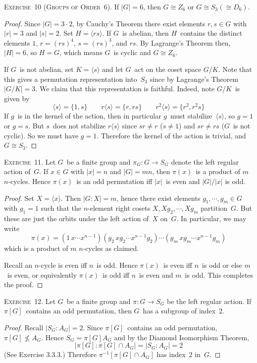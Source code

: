 \documentclass[letterpaper]{article}
\newcommand{\exercise}[1]{\goodbreak\noindent\textsc{Exercise~{#1}.}}
\newcommand{\iso}{\cong}
\newcommand{\sect}{\cap}
\newcommand{\subgroup}{\le}
\newcommand{\ord}[1]{|{#1}|}
\newcommand{\gen}[1]{\langle{#1}\rangle}
\newcommand{\gindex}[2]{|{#1}:{#2}|}
\begin{document}
\exercise{10 (Groups of Order~6)}
If $\ord{G}=6$, then $G\iso Z_6$ or $G\iso S_3(\iso D_6)$.
\begin{proof}
Since $\ord{G}=3\cdot2$, by Cauchy's Theorem there exist elements $r,s\in G$ with $\ord{r}=3$ and $\ord{s}=2$. Set $H=\gen{rs}$. If $G$~is abelian, then $H$~contains the distinct elements $1$, $r=(rs)^4$, $s=(rs)^3$, and $rs$. By Lagrange's Theorem then, $\ord{H}=6$, so $H=G$, which means $G$~is cyclic and $G\iso Z_6$.

If $G$~is not abelian, set $K=\gen{s}$ and let $G$~act on the coset space $G/K$. Note that this gives a permutation representation into~$S_3$ since by Lagrange's Theorem $\ord{G/K}=3$. We claim that this representation is faithful. Indeed, note $G/K$~is given by
$$\gen{s}=\{1,s\}\qquad r\gen{s}=\{r,rs\}\qquad r^2\gen{s}=\{r^2,r^2s\}$$
If $g$~is in the kernel of the action, then in particular $g$~must stabilize~$\gen{s}$, so $g=1$ or $g=s$. But $s$~does not stabilize $r\gen{s}$ since $sr\ne r$ ($s\ne 1$) and $sr\ne rs$ ($G$~is not cyclic). So we must have $g=1$. Therefore the kernel of the action is trivial, and $G\iso S_3$.
\end{proof}

\exercise{11}
Let $G$~be a finite group and $\pi_G:G\to S_G$ denote the left regular action of~$G$. If $x\in G$ with $\ord{x}=n$ and $\ord{G}=mn$, then $\pi(x)$~is a product of $m$ $n$-cycles. Hence $\pi(x)$~is an odd permutation iff $\ord{x}$~is even and $\ord{G}/\ord{x}$ is odd.
\begin{proof}
Set $X=\gen{x}$. Then $\gindex{G}{X}=m$, hence there exist elements $g_1,\cdots,g_m\in G$ with $g_1=1$ such that the $n$-element right cosets $X,Xg_2,\cdots,Xg_m$ partition~$G$. But these are just the orbits under the left action of~$X$ on~$G$. In particular, we may write
$$\pi(x)=(1\,x\cdots x^{n-1})(g_2\,xg_2\cdots x^{n-1}g_2)\cdots(g_m\,xg_m\cdots x^{n-1}g_m)$$
which is a product of $m$ $n$-cycles as claimed.

Recall an $n$-cycle is even iff $n$~is odd. Hence $\pi(x)$~is even iff $n$~is odd or else $m$~is even, or equivalently $\pi(x)$~is odd iff $n$~is even and $m$~is odd. This completes the proof.
\end{proof}

\exercise{12}
Let $G$~be a finite group and $\pi:G\to S_G$ be the left regular action. If $\pi[G]$~contains an odd permutation, then $G$~has a subgroup of index~$2$.
\begin{proof}
Recall $\gindex{S_G}{A_G}=2$. Since $\pi[G]$~contains an odd permutation, $\pi[G]\not\subgroup A_G$. Hence $S_G=\pi[G]A_G$ and by the Diamond Isomorphism Theorem,
$$\gindex{\pi[G]}{\pi[G]\sect A_G}=\gindex{S_G}{A_G}=2$$
(See Exercise 3.3.3.) Therefore $\pi^{-1}[\pi[G]\sect A_G]$ has index~$2$ in~$G$.
\end{proof}
\end{document}
